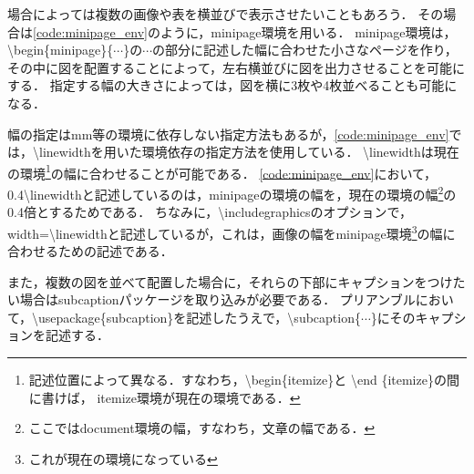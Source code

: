 場合によっては複数の画像や表を横並びで表示させたいこともあろう．
その場合は\code\ref{code:minipage_env}のように，minipage環境を用いる．
minipage環境は，\textbackslash begin\{minipage\}\{$\cdots$\}の$\cdots$の部分に記述した幅に合わせた小さなページを作り，その中に図を配置することによって，左右横並びに図を出力させることを可能にする．
指定する幅の大きさによっては，図を横に3枚や4枚並べることも可能になる．

幅の指定はmm等の環境に依存しない指定方法もあるが，\code\ref{code:minipage_env}では，\textbackslash linewidthを用いた環境依存の指定方法を使用している．
\textbackslash linewidthは現在の環境\footnote{記述位置によって異なる．すなわち，\textbackslash begin\{itemize\}と \textbackslash end \{itemize\}の間に書けば， itemize環境が現在の環境である．}の幅に合わせることが可能である．
\code\ref{code:minipage_env}において，0.4\textbackslash linewidthと記述しているのは，minipageの環境の幅を，現在の環境の幅\footnote{ここではdocument環境の幅，すなわち，文章の幅である．}の0.4倍とするためである．
ちなみに，\textbackslash includegraphicsのオプションで，width=\textbackslash linewidthと記述しているが，これは，画像の幅をminipage環境\footnote{これが現在の環境になっている}の幅に合わせるための記述である．

また，複数の図を並べて配置した場合に，それらの下部にキャプションをつけたい場合はsubcaptionパッケージを取り込みが必要である．
プリアンブルにおいて，\textbackslash usepackage\{subcaption\}を記述したうえで，\textbackslash subcaption\{$\cdots$\}にそのキャプションを記述する．

